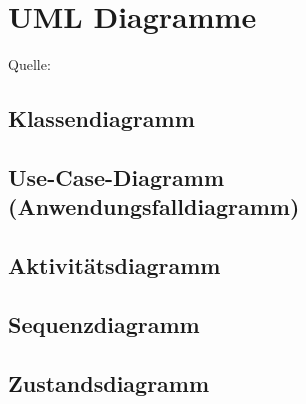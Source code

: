 \section{UML Diagramme}
\label{sec:UMLDiagramme}

Quelle: \cite{UMLDiagramme}

\subsection{Klassendiagramm}
\label{sec:Klassendiagramm}

\subsection{Use-Case-Diagramm (Anwendungsfalldiagramm)}
\label{sec:UseCaseDiagramm}

\subsection{Aktivitätsdiagramm}
\label{sec:Aktivitaetsdiagramm}

\subsection{Sequenzdiagramm}
\label{sec:Sequenzdiagramm}

\subsection{Zustandsdiagramm}
\label{sec:Zustandsdiagramm}